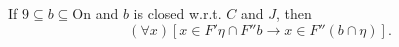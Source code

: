 If $9 \subseteq b \subseteq \mathrm{On}$ and $b$ is closed w.r.t. $C$ and $J$, then
$$(\forall x)[x \in F'\eta \cap F''b \rightarrow x \in F''(b \cap \eta)].$$

